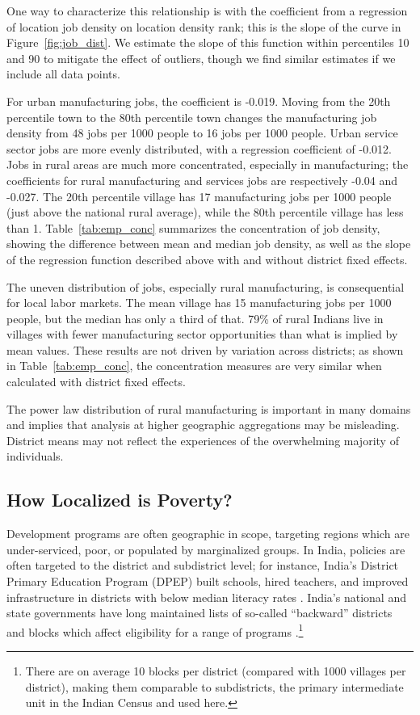 \documentclass[12pt,letterpaper]{article}
\begin{document}
One way to characterize this relationship is with the coefficient from a regression of location job density on location density rank; this is the slope of the curve in Figure~\ref{fig:job_dist}. We estimate the slope of this function within percentiles 10 and 90 to mitigate the effect of outliers, though we find similar estimates if we include all data points.

For urban manufacturing jobs, the coefficient is -0.019. Moving from the 20th percentile town to the 80th percentile town changes the manufacturing job density from 48 jobs per 1000 people to 16 jobs per 1000 people. Urban service sector jobs are more evenly distributed, with a regression coefficient of -0.012. Jobs in rural areas are much more concentrated, especially in manufacturing; the coefficients for rural manufacturing and services jobs are respectively -0.04 and -0.027. The 20th percentile village has 17 manufacturing jobs per 1000 people (just above the national rural average), while the 80th percentile village has less than 1. Table~\ref{tab:emp_conc} summarizes the concentration of job density, showing the difference between mean and median job density, as well as the slope of the regression function described above with and without district fixed effects.

The uneven distribution of jobs, especially rural manufacturing, is consequential for local labor markets. The mean village has 15 manufacturing jobs per 1000 people, but the median has only a third of that. 79\% of rural Indians live in villages with fewer manufacturing sector opportunities than what is implied by mean values. These results are not driven by variation across districts; as shown in Table~\ref{tab:emp_conc}, the concentration measures are very similar when calculated with district fixed effects.

The power law distribution of rural manufacturing is important in many domains and implies that analysis at higher geographic aggregations may be misleading. District means may not reflect the experiences of the overwhelming majority of individuals.

\subsection*{How Localized is Poverty?}

Development programs are often geographic in scope, targeting regions which are under-serviced, poor, or populated by marginalized groups. In India, policies are often targeted to the district and subdistrict level; for instance, India's District Primary Education Program (DPEP) built schools, hired teachers, and improved infrastructure in districts with below median literacy rates \cite{khanna2017}. India's national and state governments have long maintained lists of so-called ``backward'' districts and blocks which affect eligibility for a range of programs \cite{kumar2020}.\footnote{There are on average 10 blocks per district (compared with 1000 villages per district), making them comparable to subdistricts, the primary intermediate unit in the Indian Census and used here.}
\end{document}
